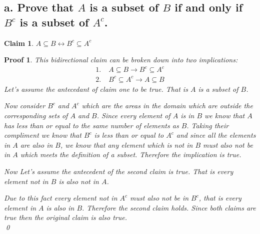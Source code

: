\documentclass{article}
\newtheorem*{claim}{Claim}
\newtheorem*{poof}{Proof}
\begin{document}
\subsection*{a. Prove that $A$ is a subset of $B$ if and only if $B^c$ is a subset of $A^c$.}
\begin{claim}
    $A \subseteq B \leftrightarrow B^c \subseteq A^c$
\end{claim}
\begin{poof}
    This bidirectional claim can be broken down into two implications:
    \begin{align*}
        1.&\;A\subseteq B \rightarrow B^c\subseteq A^c\\
        2.&\;B^c\subseteq A^c \rightarrow A\subseteq B
    \end{align*}
    Let's assume the antecedant of claim one to be true. That is $A$ is a subset of $B$.
    \begin{figure}[H]
    \centering
    \end{figure}
    Now consider $B^c$ and $A^c$ which are the areas in the domain which are outside the corresponding sets of $A$ and $B$. Since every element of $A$ is in $B$ we know that $A$ has less than or equal to the same number of elements as $B$. Taking their compliment we know that $B^c$ is less than or equal to $A^c$ and since all the elements in $A$ are also in $B$, we know that any element which is not in $B$ must also not be in $A$ which meets the definition of a subset. Therefore the implication is true.

    Now Let's assume the antecedent of the second claim is true. That is every element not in $B$ is also not in $A$.
    \begin{figure}[H]
        \centering
        \end{figure}
    Due to this fact every element not in $A^c$ must also not be in $B^c$, that is every element in $A$ is also in $B$. Therefore the second claim holds. Since both claims are true then the original claim is also true. \\ 
    \qed

\end{poof}
\end{document}
